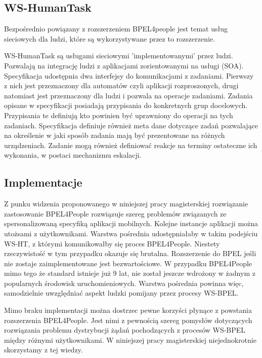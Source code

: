 \subsection{WS-HumanTask}

Bezpośrednio powiązany  z rozszerzeniem BPEL4people jest temat usług sieciowych dla ludzi, które są wykorzystywane przez to rozszerzenie.

WS-HumanTask są usługami sieciowymi 'implementowanymi' przez ludzi. Pozwalają na integrację ludzi z aplikacjami zorientowanymi na usługi (SOA). Specyfikacja udostępnia dwa interfejsy do komunikacjami z zadaniami. Pierwszy z nich jest przeznaczony dla automatów czyli aplikacji rozproszonych, drugi natomiast jest przeznaczony dla ludzi i pozwala na operacje zadaniami.  
Zadania opisane w specyfikacji posiadają przypisania do konkretnych grup docelowych. Przypisania te definiują kto powinien być uprawniony do operacji na tych zadaniach. Specyfikacja definiuje również meta dane dotyczące zadań pozwalające na określenie w jaki sposób zadania mają być prezentowane na różnych urządzeniach. Zadanie mogą również definiować reakcje na terminy ostateczne ich wykonania, w postaci mechanizmu eskalacji. 


\subsection{Implementacje}

Z punku widzenia proponowanego w niniejszej pracy magisterskiej rozwiązanie zastosowanie BPEL4People rozwiązuje szereg problemów związanych ze spersonalizowaną specyfiką aplikacji mobilnych. Kolejne instancje aplikacji można utożsami z użytkownikami. Warstwa pośrednia udostępniałaby w takim podejściu WS-HT, z którymi komunikowałby się proces BPEL4People. Niestety rzeczywistość w tym przypadku okazuje się brutalna. Rozszerzenie do BPEL jeśli nie zostaje zaimplementowane jest bezwartościowe. W przypadku BPEL4People mimo tego że standard istnieje już 9 lat, nie został jeszcze wdrożony w żadnym z popularnych środowisk uruchomieniowych.  
Warstwa pośrednia powinna więc, samodzielnie uwzględniać aspekt ludzki pomijany przez procesy WS-BPEL. 

Mimo braku implementacji można dostrzec pewne korzyści płynące z powstania rozszerzenia BPEL4People. Jest nimi z pewnością szereg pomysłów dotyczących rozwiązania problemu dystrybucji żądań pochodzących z procesów WS-BPEL między różnymi użytkownikami. W niniejszej pracy magisterskiej niejednokrotnie skorzystamy z tej wiedzy. 

